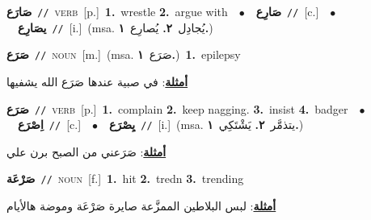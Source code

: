 \documentclass[10pt,a4paper,twoside]{article} %
\begin{document}
\begin{multicols}{2}
{\setlength\topsep{0pt}\textbf{\foreignlanguage{arabic}{صَارَع}}\ {\color{gray}\texttt{//}\color{black}}\ \textsc{verb}\ [p.]\ \textbf{1.}~wrestle  \textbf{2.}~argue with\ \ $\bullet$\ \ \setlength\topsep{0pt}\textbf{\foreignlanguage{arabic}{صَارِع}}\ {\color{gray}\texttt{//}\color{black}}\ [c.]\ \ $\bullet$\ \ \setlength\topsep{0pt}\textbf{\foreignlanguage{arabic}{يصَارِع}}\ {\color{gray}\texttt{//}\color{black}}\ [i.]\ \color{gray}(msa. \foreignlanguage{arabic}{يُجادِل}~\foreignlanguage{arabic}{\textbf{٢.}}  \foreignlanguage{arabic}{يُصارِع}~\foreignlanguage{arabic}{\textbf{١.}})\color{black}\ } \vspace{2mm}

{\setlength\topsep{0pt}\textbf{\foreignlanguage{arabic}{صَرَع}}\ {\color{gray}\texttt{//}\color{black}}\ \textsc{noun}\ [m.]\ \color{gray}(msa. \foreignlanguage{arabic}{صَرَع}~\foreignlanguage{arabic}{\textbf{١.}})\color{black}\ \textbf{1.}~epilepsy\  \begin{flushright}\color{gray}\foreignlanguage{arabic}{\textbf{\underline{\foreignlanguage{arabic}{أمثلة}}}: في صبية عندها صَرَع الله يشفيها}\end{flushright}\color{black}} \vspace{2mm}

{\setlength\topsep{0pt}\textbf{\foreignlanguage{arabic}{صَرَع}}\ {\color{gray}\texttt{//}\color{black}}\ \textsc{verb}\ [p.]\ \textbf{1.}~complain  \textbf{2.}~keep nagging.  \textbf{3.}~insist  \textbf{4.}~badger\ \ $\bullet$\ \ \setlength\topsep{0pt}\textbf{\foreignlanguage{arabic}{اِصْرَع}}\ {\color{gray}\texttt{//}\color{black}}\ [c.]\ \ $\bullet$\ \ \setlength\topsep{0pt}\textbf{\foreignlanguage{arabic}{يِصْرَع}}\ {\color{gray}\texttt{//}\color{black}}\ [i.]\ \color{gray}(msa. \foreignlanguage{arabic}{يتذمَّر}~\foreignlanguage{arabic}{\textbf{٢.}}  \foreignlanguage{arabic}{يَشْتَكِي}~\foreignlanguage{arabic}{\textbf{١.}})\color{black}\  \begin{flushright}\color{gray}\foreignlanguage{arabic}{\textbf{\underline{\foreignlanguage{arabic}{أمثلة}}}: صَرَعني من الصبح برن علي}\end{flushright}\color{black}} \vspace{2mm}

{\setlength\topsep{0pt}\textbf{\foreignlanguage{arabic}{صَرْعَة}}\ {\color{gray}\texttt{//}\color{black}}\ \textsc{noun}\ [f.]\ \textbf{1.}~hit  \textbf{2.}~tredn  \textbf{3.}~trending\  \begin{flushright}\color{gray}\foreignlanguage{arabic}{\textbf{\underline{\foreignlanguage{arabic}{أمثلة}}}: لبس البلاطين الممزَّعة صايرة صَرْعَة وموضة هالأيام}\end{flushright}\color{black}} \vspace{2mm}


\end{multicols}
\end{document}
